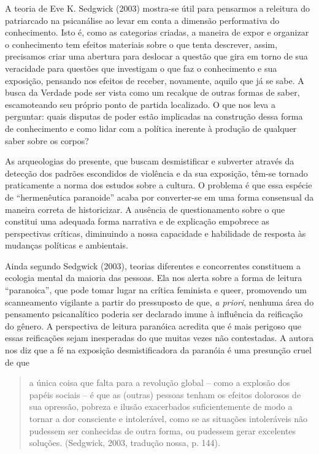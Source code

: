 A teoria de Eve K. Sedgwick (2003) mostra-se útil para pensarmos a
releitura do patriarcado na psicanálise ao levar em conta a dimensão
performativa do conhecimento. Isto é, como as categorias criadas, a
maneira de expor e organizar o conhecimento tem efeitos materiais sobre
o que tenta descrever, assim, precisamos criar uma abertura para
deslocar a questão que gira em torno de sua veracidade para questões que
investigam o que faz o conhecimento e sua exposição, pensando nos
efeitos de receber, novamente, aquilo que já se sabe. A busca da Verdade
pode ser vista como um recalque de outras formas de saber, escamoteando
seu próprio ponto de partida localizado. O que nos leva a perguntar:
quais disputas de poder estão implicadas na construção dessa forma de
conhecimento e como lidar com a política inerente à produção de qualquer
saber sobre os corpos?

As arqueologias do presente, que buscam desmistificar e subverter
através da detecção dos padrões escondidos de violência e da sua
exposição, têm-se tornado praticamente a norma dos estudos sobre a
cultura. O problema é que essa espécie de ``hermenêutica paranoide''
acaba por converter-se em uma forma consensual da maneira correta de
historicizar. A ausência de questionamento sobre o que constitui uma
adequada forma narrativa e de explicação empobrece as perspectivas
críticas, diminuindo a nossa capacidade e habilidade de resposta às
mudanças políticas e ambientais.

Ainda segundo Sedgwick (2003), teorias diferentes e concorrentes
constituem a ecologia mental da maioria das pessoas. Ela nos alerta
sobre a forma de leitura ``paranoica'', que pode tomar lugar na crítica
feminista e queer, promovendo um scanneamento vigilante a partir do
pressuposto de que, \emph{a priori}, nenhuma área do pensamento
psicanalítico poderia ser declarado imune à influência da reificação do
gênero. A perspectiva de leitura paranóica acredita que é mais perigoso
que essas reificações sejam inesperadas do que muitas vezes não
contestadas. A autora nos diz que a fé na exposição desmistificadora da
paranóia é uma presunção cruel de que

\begin{quote}
a única coisa que falta para a revolução global -- como a explosão dos
papéis sociais -- é que as (outras) pessoas tenham os efeitos dolorosos
de sua opressão, pobreza e ilusão exacerbados suficientemente de modo a
tornar a dor consciente e intolerável, como se as situações intoleráveis
não pudessem ser conhecidas de outra forma, ou pudessem gerar excelentes
soluções. (Sedgwick, 2003, tradução nossa, p. 144).
\end{quote}

